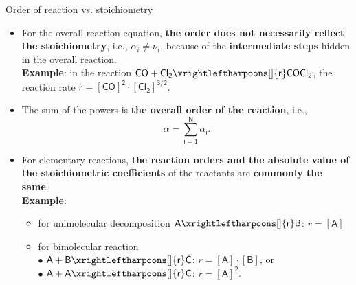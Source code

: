 \begin{frame}{Order of reaction vs. stoichiometry}
	\small
	\begin{itemize}
	\item For the overall reaction equation, \alert{\bf the order does not necessarily reflect the stoichiometry}, i.e., 
	$\alpha_i \neq \nu_i$,
	because of the {\bf intermediate steps} hidden in the overall reaction.\\[5pt]
	{\bf Example}: in the reaction $\mathsf{CO + Cl_2 \xrightleftharpoons[]{r} COCl_2}$, the reaction rate $r = \mathsf{[CO]^2 \cdot [Cl_2]^{3/2}}$.
	\pause
	\item The sum of the powers is \alert{\bf the overall order of the reaction}, i.e., 
	\[\mathsf{\alpha = \sum_{i=1}^{N} \alpha_i}.\]
	\pause
	\item For elementary reactions, {\bf the reaction orders and the absolute value of the stoichiometric
coefficients} of the reactants are \alert{\bf commonly the same}. \\[5pt]
%
    {\bf Example}:
	\begin{itemize}
	\item for unimolecular decomposition $\mathsf{A \xrightleftharpoons[]{r} B}$: $r = \mathsf{[A]}$
	\item for bimolecular reaction \\[5pt]
 	$\bullet$ $\mathsf{A + B \xrightleftharpoons[]{r} C}$: $r = \mathsf{[A] \cdot [B]}$, or \\
	$\bullet$ $\mathsf{A + A \xrightleftharpoons[]{r} C}$: $r = \mathsf{[A]^2}$.
	\end{itemize}
\end{itemize}
\end{frame}
%
%

